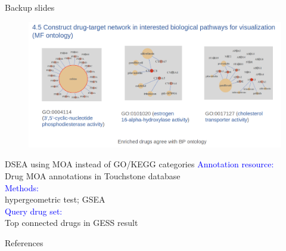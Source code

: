 \documentclass[10pt]{beamer}
\begin{document}
\begin{frame}{Backup slides}
    \begin{figure}
        \includegraphics[width=12cm]{demo/images/dtnet_mf.png}
    \end{figure}
\end{frame}
\begin{frame}[fragile]{DSEA using MOA instead of GO/KEGG categories}
\vspace{-1.6cm}
\textcolor{blue}{Annotation resource:} \\
Drug MOA annotations in Touchstone database \\
\vspace{0.6cm}
\textcolor{blue}{Methods:} \\
hypergeometric test; GSEA \\
\vspace{0.6cm}
\textcolor{blue}{Query drug set:} \\ Top connected drugs in GESS result
\end{frame}
\begin{frame}[allowframebreaks]{References}
  
  
\end{frame}
\end{document}
